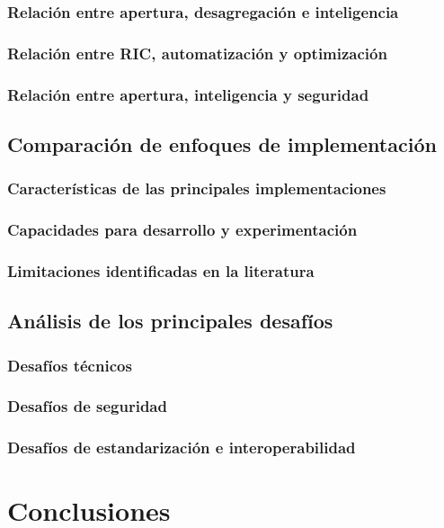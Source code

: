 \documentclass[11pt,a4paper]{article}
\makeatletter
\let\ORIGsection\section
\def\section{\@nobreakfalse\ORIGsection}
\let\ORIGsubsection\subsection
\def\subsection{\@nobreakfalse\ORIGsubsection}
\let\ORIGsubsubsection\subsubsection
\def\subsubsection{\@nobreakfalse\ORIGsubsubsection}
\makeatother
\begin{document}
\subsubsection{Relación entre apertura, desagregación e inteligencia}
\subsubsection{Relación entre RIC, automatización y optimización}
\subsubsection{Relación entre apertura, inteligencia y seguridad}

\subsection{Comparación de enfoques de implementación}

\subsubsection{Características de las principales implementaciones}
\subsubsection{Capacidades para desarrollo y experimentación}
\subsubsection{Limitaciones identificadas en la literatura}

\subsection{Análisis de los principales desafíos}

\subsubsection{Desafíos técnicos}
\subsubsection{Desafíos de seguridad}
\subsubsection{Desafíos de estandarización e interoperabilidad}


\section{Conclusiones}
\end{document}
